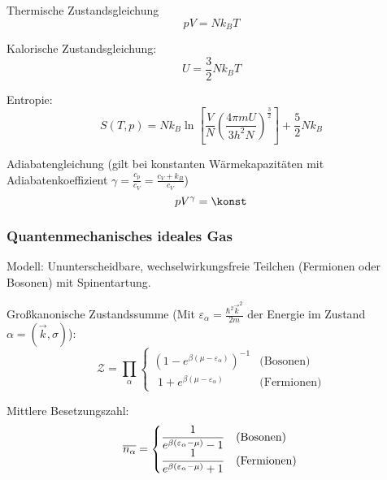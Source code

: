 \documentclass[11pt]{article}
\numberwithin{equation}{section}
\begin{document}
        Thermische Zustandsgleichung
        \begin{equation}
          pV = N k_B T
        \end{equation}

        Kalorische Zustandsgleichung:
        \begin{equation}
          U = \frac{3}{2} N k_B T
        \end{equation}

        Entropie:
        \begin{equation}
          S(T,p) = N k_B \ln{\left[ \frac{V}{N}\left( \frac{4\pi m  U}{3 h^2 N} \right)^{\frac{3}{2}} \right]} + \frac{5}{2} N k_B
        \end{equation}

        Adiabatengleichung \newline(gilt bei konstanten Wärmekapazitäten mit Adiabatenkoeffizient $\gamma = \frac{c_p}{c_V} = \frac{c_V + k_B}{c_V}$)
        \begin{equation}
          p V^\gamma = \konst
        \end{equation}

      \subsubsection{Quantenmechanisches ideales Gas}
        Modell: Ununterscheidbare, wechselwirkungsfreie Teilchen (Fermionen oder Bosonen) mit Spinentartung. \vsp

        Großkanonische Zustandssumme (Mit $\varepsilon_\alpha = \frac{\hbar^2 \vec{k}^2}{2m}$ der Energie im Zustand $\alpha=(\vec{k},\sigma)$):
        \begin{equation}
          \mathcal{Z} = \prod_{\alpha}
            \begin{cases}
              \left( 1-e^{\beta(\mu-\varepsilon_\alpha)}\right)^{-1} & \text{(Bosonen)} \\
              \phantom{\big(} 1+e^{\beta(\mu-\varepsilon_\alpha)} & \text{(Fermionen)}
            \end{cases}
        \end{equation}

        Mittlere Besetzungszahl:
        \begin{equation}
          \overline{n_\alpha} =
              \begin{cases}
                \dfrac{1}{e^{\beta(\varepsilon_\alpha-\mu)} - 1} & \text{(Bosonen)} \\
                \dfrac{1}{e^{\beta(\varepsilon_\alpha-\mu)} + 1} & \text{(Fermionen)}
              \end{cases} \\
        \end{equation}
\end{document}
